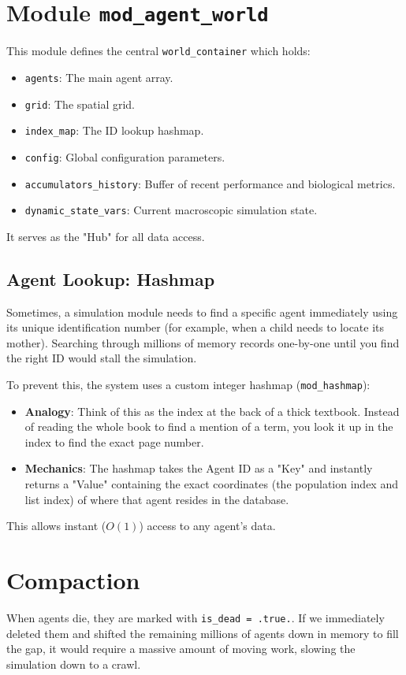 \section{Module \texttt{mod\_agent\_world}}
This module defines the central \texttt{world\_container} which holds:
\begin{itemize}
    \item \texttt{agents}: The main agent array.
    \item \texttt{grid}: The spatial grid.
    \item \texttt{index\_map}: The ID lookup hashmap.
    \item \texttt{config}: Global configuration parameters.
    \item \texttt{accumulators\_history}: Buffer of recent performance and biological metrics.
    \item \texttt{dynamic\_state\_vars}: Current macroscopic simulation state.
\end{itemize}
It serves as the "Hub" for all data access.

\subsection{Agent Lookup: Hashmap}
Sometimes, a simulation module needs to find a specific agent immediately using its unique identification number (for example, when a child needs to locate its mother). Searching through millions of memory records one-by-one until you find the right ID would stall the simulation.

To prevent this, the system uses a custom integer hashmap (\texttt{mod\_hashmap}):
\begin{itemize}
    \item \textbf{Analogy}: Think of this as the index at the back of a thick textbook. Instead of reading the whole book to find a mention of a term, you look it up in the index to find the exact page number.
    \item \textbf{Mechanics}: The hashmap takes the Agent ID as a "Key" and instantly returns a "Value" containing the exact coordinates (the population index and list index) of where that agent resides in the database.
\end{itemize}
This allows instant ($O(1)$) access to any agent's data.

\section{Compaction}
When agents die, they are marked with \texttt{is\_dead = .true.}. If we immediately deleted them and shifted the remaining millions of agents down in memory to fill the gap, it would require a massive amount of moving work, slowing the simulation down to a crawl.


